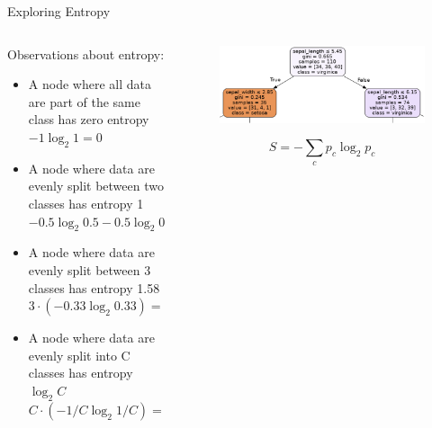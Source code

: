 \documentclass[aspectratio=169]{../latex_main/tntbeamer}  %
\begin{document}
	
	\begin{frame}{Exploring Entropy}
	    \begin{columns}
	        \begin{column}{.7\textwidth}
	                Observations about entropy:
	                \begin{itemize}
	                    \item A node where all data are part of the same class has zero entropy \\ $-1 \log_2 1 = 0$
	                    \item A node where data are evenly split between two classes has
	                    entropy 1 \\$−0.5 \log_2{ 0.5} − 0.5\log_2{ 0.5}= 1$
	                    \item A node where data are evenly split between 3 classes has entropy 1.58 \\$3 \cdot (−0.33 \log_2{ 0.33}) = 1.58$
	                    \item A node where data are evenly split into C classes has entropy $\log_2{C}$ \\ $C \cdot (−1/C \log_{2}{⁡ 1/C}) = −\log_{2}{⁡ 1/C} = \log_{2}{⁡C}$
	                \end{itemize}
	        \end{column}
	        
	        \begin{column}{.3\textwidth}
	                \begin{figure}
	                    \centering
	                    \includegraphics[scale=.35]{Bild47}
	                \end{figure}
	                \begin{equation*}
                          S = -\sum\limits_c p_c\log_2p_c
                    \end{equation*}
	                
	        \end{column}
	    \end{columns}
	\end{frame}
	
\end{document}
